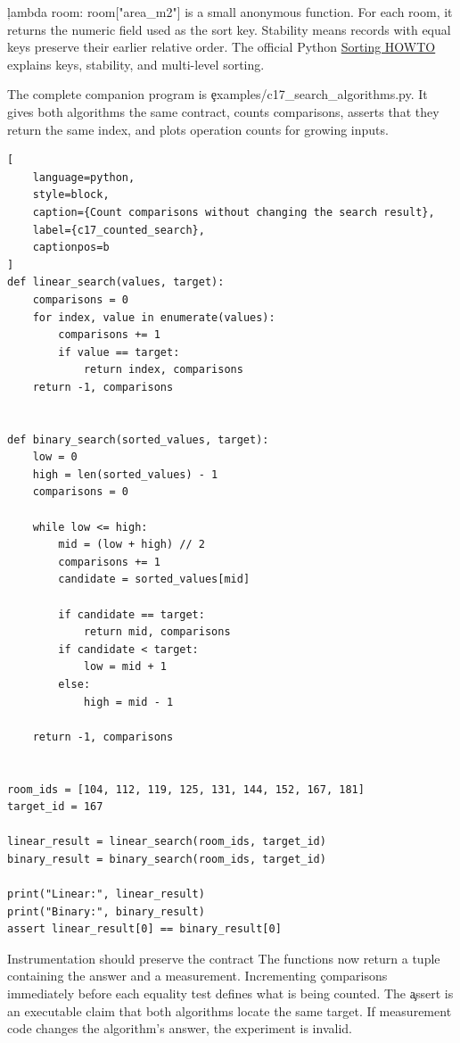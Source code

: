 \c{lambda room: room["area_m2"]} is a small anonymous function. For each room,
it returns the numeric field used as the sort key. Stability means records with
equal keys preserve their earlier relative order. The official Python
\href{https://docs.python.org/3/howto/sorting.html}{Sorting HOWTO} explains
keys, stability, and multi-level sorting.

\label{sec:c17-application}

The complete companion program is
\c{examples/c17_search_algorithms.py}. It gives both algorithms the same
contract, counts comparisons, asserts that they return the same index, and
plots operation counts for growing inputs.

\begin{lstlisting}[
    language=python,
    style=block,
    caption={Count comparisons without changing the search result},
    label={c17_counted_search},
    captionpos=b
]
def linear_search(values, target):
    comparisons = 0
    for index, value in enumerate(values):
        comparisons += 1
        if value == target:
            return index, comparisons
    return -1, comparisons


def binary_search(sorted_values, target):
    low = 0
    high = len(sorted_values) - 1
    comparisons = 0

    while low <= high:
        mid = (low + high) // 2
        comparisons += 1
        candidate = sorted_values[mid]

        if candidate == target:
            return mid, comparisons
        if candidate < target:
            low = mid + 1
        else:
            high = mid - 1

    return -1, comparisons


room_ids = [104, 112, 119, 125, 131, 144, 152, 167, 181]
target_id = 167

linear_result = linear_search(room_ids, target_id)
binary_result = binary_search(room_ids, target_id)

print("Linear:", linear_result)
print("Binary:", binary_result)
assert linear_result[0] == binary_result[0]
\end{lstlisting}

\begin{SyntaxBox}{Instrumentation should preserve the contract}
The functions now return a tuple containing the answer and a measurement.
Incrementing \c{comparisons} immediately before each equality test defines what
is being counted. The \c{assert} is an executable claim that both algorithms
locate the same target. If measurement code changes the algorithm's answer, the
experiment is invalid.
\end{SyntaxBox}


